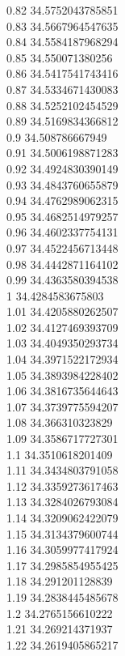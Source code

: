 {0.82	34.5752043785851\\
0.83	34.5667964547635\\
0.84	34.5584187968294\\
0.85	34.550071380256\\
0.86	34.5417541743416\\
0.87	34.5334671430083\\
0.88	34.5252102454529\\
0.89	34.5169834366812\\
0.9	34.508786667949\\
0.91	34.5006198871283\\
0.92	34.4924830390149\\
0.93	34.4843760655879\\
0.94	34.4762989062315\\
0.95	34.4682514979257\\
0.96	34.4602337754131\\
0.97	34.4522456713448\\
0.98	34.4442871164102\\
0.99	34.4363580394538\\
1	34.4284583675803\\
1.01	34.4205880262507\\
1.02	34.4127469393709\\
1.03	34.4049350293734\\
1.04	34.3971522172934\\
1.05	34.3893984228402\\
1.06	34.3816735644643\\
1.07	34.3739775594207\\
1.08	34.366310323829\\
1.09	34.3586717727301\\
1.1	34.3510618201409\\
1.11	34.3434803791058\\
1.12	34.3359273617463\\
1.13	34.3284026793084\\
1.14	34.3209062422079\\
1.15	34.3134379600744\\
1.16	34.3059977417924\\
1.17	34.2985854955425\\
1.18	34.291201128839\\
1.19	34.2838445485678\\
1.2	34.2765156610222\\
1.21	34.269214371937\\
1.22	34.2619405865217\\
}
